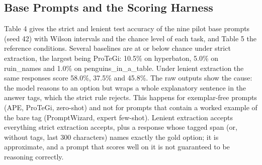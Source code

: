 \documentclass{ieeeaccess}
\begin{document}
\subsection{Base Prompts and the Scoring Harness}

Table 4 gives the strict and lenient test accuracy of the nine pilot base prompts (seed 42) with Wilson intervals \cite{wilson1927} and the chance level of each task, and Table 5 the reference conditions. Several baselines are at or below chance under strict extraction, the largest being ProTeGi: 10.5\% on hyperbaton, 5.0\% on ruin\_\allowbreak{}names and 1.0\% on penguins\_\allowbreak{}in\_\allowbreak{}a\_\allowbreak{}table. Under lenient extraction the same responses score 58.0\%, 37.5\% and 45.8\%. The raw outputs show the cause: the model reasons to an option but wraps a whole explanatory sentence in the answer tags, which the strict rule rejects. This happens for exemplar-free prompts (APE, ProTeGi, zero-shot) and not for prompts that contain a worked example of the bare tag (PromptWizard, expert few-shot). Lenient extraction accepts everything strict extraction accepts, plus a response whose tagged span (or, without tags, last 300 characters) names exactly the gold option; it is approximate, and a prompt that scores well on it is not guaranteed to be reasoning correctly.
\end{document}
